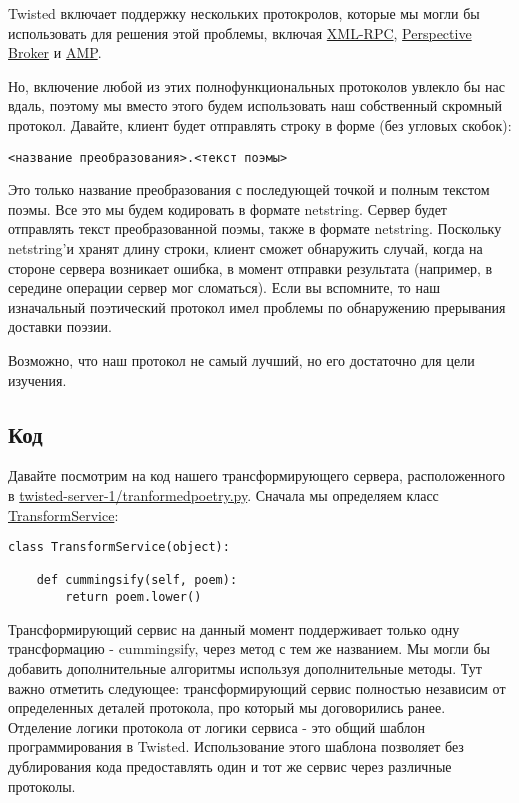 Twisted включает поддержку нескольких протокролов, 
которые мы могли бы использовать для решения этой 
проблемы, включая \href{http://twistedmatrix.com/trac/browser/tags/releases/twisted-8.2.0/twisted/web/xmlrpc.py}{XML-RPC}, \href{http://twistedmatrix.com/documents/current/core/howto/pb-intro.html}{Perspective Broker} и \href{http://twistedmatrix.com/trac/browser/tags/releases/twisted-8.2.0/twisted/protocols/amp.py}{AMP}. 


Но, включение любой из этих полнофункциональных протоколов 
увлекло бы нас вдаль, поэтому мы вместо этого будем использовать 
наш собственный скромный протокол. Давайте, клиент будет отправлять 
строку в форме (без угловых скобок):

 \begin{verbatim}
<название преобразования>.<текст поэмы>
\end{verbatim} 


Это только название преобразования с последующей точкой и 
полным текстом поэмы. Все это мы будем кодировать в формате netstring. 
Сервер будет отправлять текст преобразованной поэмы, также в формате  
netstring. Поскольку netstring'и хранят длину строки, клиент 
сможет обнаружить случай, когда на стороне сервера возникает ошибка, 
в момент отправки результата (например, в середине операции сервер мог сломаться). 
Если вы вспомните, то наш изначальный поэтический протокол 
имел проблемы по обнаружению прерывания доставки поэзии.  


Возможно, что наш протокол не самый лучший, но его достаточно 
для цели изучения.

\subsection{Код}

Давайте посмотрим на код нашего трансформирующего сервера, 
расположенного в \href{http://github.com/jdavisp3/twisted-intro/blob/master/twisted-server-1/tranformedpoetry.py#L1}{twisted-server-1/tranformedpoetry.py}. Сначала мы определяем 
класс \href{http://github.com/jdavisp3/twisted-intro/blob/master/twisted-server-1/tranformedpoetry.py#L41}{TransformService}:

 \begin{verbatim}
class TransformService(object):

    def cummingsify(self, poem):
        return poem.lower()
\end{verbatim} 


Трансформирующий сервис на данный момент поддерживает 
только одну трансформацию - cummingsify, через метод 
с тем же названием. Мы могли бы добавить дополнительные алгоритмы 
используя дополнительные методы. Тут важно отметить следующее: 
трансформирующий сервис полностью независим от определенных 
деталей протокола, про который мы договорились ранее. Отделение логики 
протокола от логики сервиса - это общий шаблон программирования  
в Twisted. Использование этого шаблона позволяет без дублирования кода 
предоставлять один и тот же сервис через различные протоколы.


